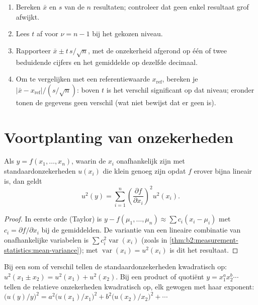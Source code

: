 \begin{method}\label{met:b2:measurement-statistics:confidence-interval}
\begin{enumerate}
  \item Bereken $\bar x$ en $s$ van de $n$ resultaten; controleer dat geen enkel resultaat grof afwijkt.
  \item Lees $t$ af voor $\nu = n - 1$ bij het gekozen niveau.
  \item Rapporteer $\bar x \pm t\,s/\sqrt n$, met de onzekerheid afgerond op één of twee beduidende cijfers
        en het gemiddelde op dezelfde decimaal.
  \item Om te vergelijken met een referentiewaarde $x_{\mathrm{ref}}$, bereken je $|\bar x - x_{\mathrm{ref}}|/(s/\sqrt
        n)$: boven $t$ is het verschil significant op dat niveau; eronder tonen de gegevens geen
        verschil (wat niet bewijst dat er geen is).
\end{enumerate}
\end{method}

\section{Voortplanting van onzekerheden}

\begin{theorem}\label{thm:b2:measurement-statistics:propagation}
Als $y = f(x_1, \dots, x_n)$, waarin de $x_i$ onafhankelijk zijn met standaardonzekerheden $u(x_i)$ die klein
genoeg zijn opdat $f$ erover bijna lineair is, dan geldt
\begin{equation*}
u^2(y) = \sum_{i=1}^{n}\left(\frac{\partial f}{\partial x_i}\right)^2 u^2(x_i).
\end{equation*}
\end{theorem}

\begin{proof}
In eerste orde (Taylor) is $y - f(\mu_1, \dots, \mu_n) \approx \sum c_i(x_i - \mu_i)$ met $c_i = \partial
f/\partial x_i$ bij de gemiddelden. De variantie van een lineaire combinatie van onafhankelijke variabelen is
$\sum c_i^2\operatorname{var}(x_i)$ (zoals in \cref{thm:b2:measurement-statistics:mean-variance}); met
$\operatorname{var}(x_i) = u^2(x_i)$ is dit het resultaat.
\end{proof}

\begin{corollary}\label{cor:b2:measurement-statistics:products}
Bij een som of verschil tellen de standaardonzekerheden kwadratisch op: $u^2(x_1 \pm x_2) = u^2(x_1) +
u^2(x_2)$. Bij een product of quotiënt $y = x_1^{a}x_2^{b}\cdots$ tellen de relatieve onzekerheden kwadratisch
op, elk gewogen met haar exponent: $\bigl(u(y)/y\bigr)^2 = a^2\bigl(u(x_1)/x_1\bigr)^2 +
b^2\bigl(u(x_2)/x_2\bigr)^2 + \cdots$
\end{corollary}

